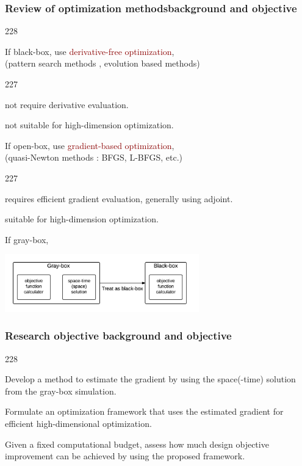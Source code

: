 \documentclass{beamer}
\let\oldcite=\cite
\renewcommand{\cite}[1]{\textcolor[rgb]{.4,.4,.85}{\oldcite{#1}}}
\newcommand{\barrow}{\item[\color{darkred}\ding{228}]}
\newcommand{\carrow}{\item[\color{darkred}\ding{227}]}
\begin{document}
\begin{frame}
    \frametitle{Review of optimization methods\hfill \scriptsize{background and objective}}\small
    \begin{dinglist}{228}
        \barrow If {black-box}, use \textcolor{darkred}{derivative-free optimization},\\
                \scriptsize{
                (pattern search methods \cite{Tarma03}, evolution based methods\cite{Eberhart 10, Davis 10})}
                \small
                \begin{dinglist}{227}
                    \carrow not require derivative evaluation.
                    \carrow not suitable for high-dimension optimization.
                \end{dinglist}
        \barrow If open-box, use \textcolor{darkred}{gradient-based optimization},\\
                \scriptsize
                (quasi-Newton methods \cite{John 77}: BFGS, L-BFGS, etc.)
                \small
                \begin{dinglist}{227}
                    \carrow requires efficient gradient evaluation, generally using adjoint.
                    \carrow suitable for high-dimension optimization.
                \end{dinglist}
        \barrow If gray-box,
    \end{dinglist}
    \begin{center}
        \includegraphics[height=2.5cm]{treat.png}
    \end{center}   
\end{frame}


\begin{frame}
    \frametitle{Research objective \hfill \scriptsize{background and objective}}\small
    \begin{dinglist}{228}
        \barrow Develop a method to estimate the gradient by using the space(-time) solution
                from the gray-box simulation.
        \vspace{.1cm}
        \barrow Formulate an optimization framework that uses the estimated gradient for efficient high-dimensional 
                optimization.
        \vspace{.1cm}
        \barrow Given a fixed computational budget, assess how much design objective improvement 
                can be achieved by using the proposed framework.
    \end{dinglist}
\end{frame}
\end{document}
